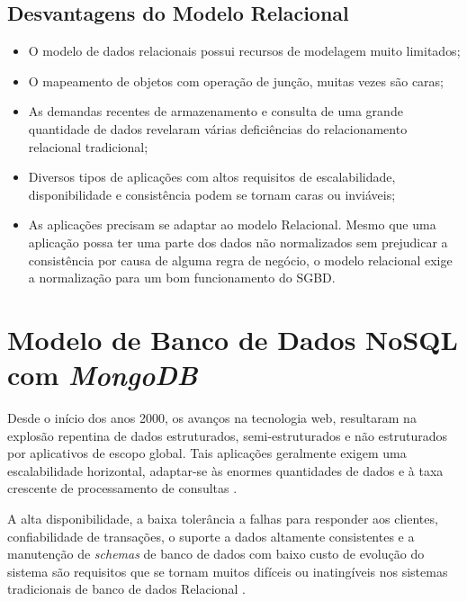 \subsection{Desvantagens do Modelo Relacional}

    
\begin{itemize}
    \item O modelo de dados relacionais possui recursos de modelagem muito limitados;
        
    \item O mapeamento de objetos com operação de junção, muitas vezes são caras;
        
    \item As demandas recentes de armazenamento e consulta de uma grande quantidade 
         de dados revelaram várias deficiências do relacionamento relacional tradicional;
        
    \item Diversos tipos de aplicações com altos requisitos de escalabilidade, disponibilidade e
          consistência podem se tornam caras ou inviáveis;
        
    \item As aplicações precisam se adaptar ao modelo Relacional. Mesmo que uma aplicação
         possa ter uma parte dos dados não normalizados sem prejudicar a consistência por
         causa de alguma regra de negócio, o modelo relacional exige a normalização para
         um bom funcionamento do SGBD.
\end{itemize}

\section{Modelo de Banco de Dados NoSQL com \textit{MongoDB}}
    
Desde o início dos anos 2000, os avanços na tecnologia web, resultaram na explosão repentina de dados estruturados, semi-estruturados e não estruturados por aplicativos de escopo global. Tais aplicações geralmente exigem uma escalabilidade horizontal, adaptar-se às enormes quantidades de dados e à taxa crescente de processamento de consultas \cite{davoudian2018survey}.
    
A alta disponibilidade, a baixa tolerância a falhas para responder aos clientes, confiabilidade de transações, o suporte a dados altamente consistentes e a manutenção de \textit{schemas} de banco de dados com baixo custo de evolução do sistema são requisitos que se tornam muitos difíceis ou inatingíveis nos sistemas tradicionais de banco de dados Relacional \cite{davoudian2018survey}.
    

